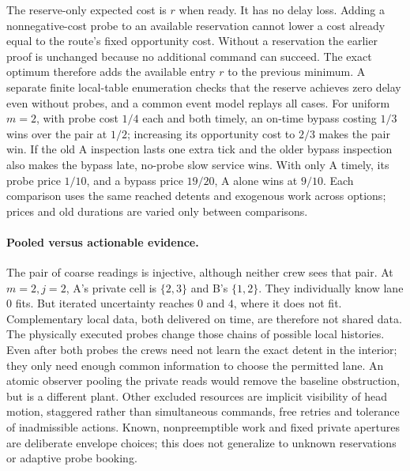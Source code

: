 \documentclass[11pt]{article}
\begin{document}
The reserve-only expected cost is $r$ when ready. It has no delay loss. Adding a nonnegative-cost probe to an available reservation cannot lower a cost already equal to the route's fixed opportunity cost. Without a reservation the earlier proof is unchanged because no additional command can succeed. The exact optimum therefore adds the available entry $r$ to the previous minimum. A separate finite local-table enumeration checks that the reserve achieves zero delay even without probes, and a common event model replays all cases. For uniform $m=2$, with probe cost $1/4$ each and both timely, an on-time bypass costing $1/3$ wins over the pair at $1/2$; increasing its opportunity cost to $2/3$ makes the pair win. If the old A inspection lasts one extra tick and the older bypass inspection also makes the bypass late, no-probe slow service wins. With only A timely, its probe price $1/10$, and a bypass price $19/20$, A alone wins at $9/10$. Each comparison uses the same reached detents and exogenous work across options; prices and old durations are varied only between comparisons.

\paragraph{Pooled versus actionable evidence.}
The pair of coarse readings is injective, although neither crew sees that pair. At $m=2,j=2$, A's private cell is $\{2,3\}$ and B's $\{1,2\}$. They individually know lane $0$ fits. But iterated uncertainty reaches $0$ and $4$, where it does not fit. Complementary local data, both delivered on time, are therefore not shared data. The physically executed probes change those chains of possible local histories. Even after both probes the crews need not learn the exact detent in the interior; they only need enough common information to choose the permitted lane. An atomic observer pooling the private reads would remove the baseline obstruction, but is a different plant. Other excluded resources are implicit visibility of head motion, staggered rather than simultaneous commands, free retries and tolerance of inadmissible actions. Known, nonpreemptible work and fixed private apertures are deliberate envelope choices; this does not generalize to unknown reservations or adaptive probe booking.
\end{document}

